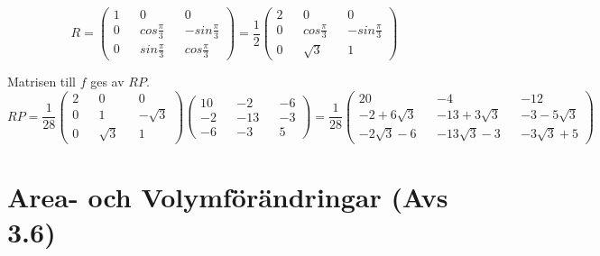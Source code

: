 \begin{equation*}
    R=\begin{pmatrix}
        1&&0&&0\\
        0&&cos\frac{\pi}{3}&&-sin\frac{\pi}{3}\\
        0&&sin\frac{\pi}{3}&&cos\frac{\pi}{3}
    \end{pmatrix}=
    \frac{1}{2}\begin{pmatrix}
        2&&0&&0\\
        0&&cos\frac{\pi}{3}&&-sin\frac{\pi}{3}\\
        0&&\sqrt{3}&&1
    \end{pmatrix}
\end{equation*}

Matrisen till $f$ ges av $RP$.\\
\begin{equation*}
    RP=\frac{1}{28}\begin{pmatrix}
        2&&0&&0\\
        0&&1&&-\sqrt{3}\\
        0&&\sqrt{3}&&1
    \end{pmatrix}\begin{pmatrix}
        10&&-2&&-6\\
        -2&&-13&&-3\\
        -6&&-3&&5
    \end{pmatrix}=
    \frac{1}{28}\begin{pmatrix}
        20&&-4&&-12\\
        -2+6\sqrt{3}&&-13+3\sqrt{3}&&-3-5\sqrt{3}\\
        -2\sqrt{3}-6&&-13\sqrt{3}-3&&-3\sqrt{3}+5
    \end{pmatrix}
\end{equation*}

\chapter{Area- och Volymförändringar (Avs 3.6)}

